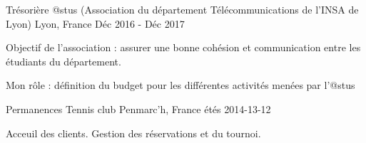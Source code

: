 

\begin{cventries}

  \cventry
    {Trésorière} %
    {@stus (Association du département Télécommunications de l'INSA de Lyon)}  %
    {Lyon, France} %
    {Déc 2016 - Déc 2017} %
    {
      \begin{cvitems} %
        \item {Objectif de l'association : assurer une bonne cohésion et communication entre les étudiants du département.}
        \item {Mon rôle : définition du budget pour les différentes activités menées par l'@stus}
      \end{cvitems}
    }

  \cventry
    {Permanences} %
    {Tennis club} %
    {Penmarc'h, France} %
    {étés 2014-13-12} %
    {
      \begin{cvitems} %
        \item {Acceuil des clients. Gestion des réservations et du tournoi.}
      \end{cvitems}
    }


\end{cventries}
